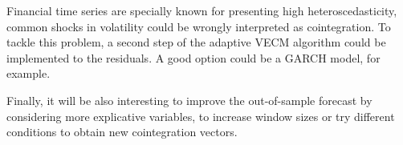 Financial time series are specially known for presenting high heteroscedasticity, common shocks in volatility could be wrongly interpreted as cointegration. To tackle this problem, a second step of the adaptive VECM algorithm could be implemented to the residuals. A good option could be a GARCH model, for example.  

Finally, it will be also interesting to improve the out-of-sample forecast
by considering more explicative variables, to increase window sizes or try different
conditions to obtain new cointegration vectors.

